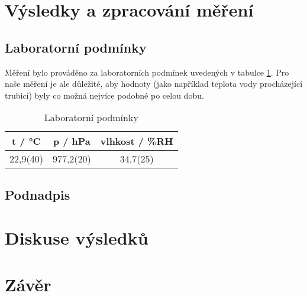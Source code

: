 \section{Výsledky a zpracování měření}

\subsection{Laboratorní podmínky}

    Měření bylo prováděno za laboratorních podmínek uvedených v tabulce \ref{tab:lab_pod}. Pro naše měření je ale důležité, aby hodnoty (jako například teplota vody procházející  trubicí) byly co možná nejvíce podobné po celou dobu.

    \begin{table}[h]
        \centering
        \caption{Laboratorní podmínky}
        \label{tab:lab_pod}
        \begin{tabular}{|c|c|c|} 
        \hline
            t / °C & p / hPa & vlhkost / \%RH  \\ 
        \hline
            22,9(40)   & 977,2(20)   & 34,7(25)            \\
        \hline
        \end{tabular}
    \end{table}

\subsection{Podnadpis}

    
\section{Diskuse výsledků}

\section{Závěr}
